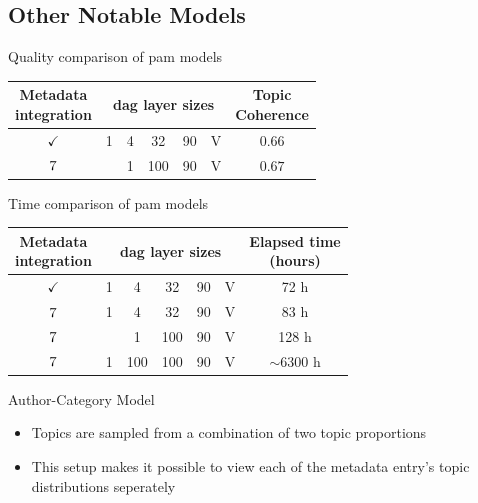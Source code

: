\subsection{Other Notable Models}

\begin{frame}{\insertsubsection}{Quality comparison of \acrshort{pam} models}
	\centering
	\begin{tabular}{c|c|c|c|c|c|c}
		\makecell{Metadata \\ integration} & \multicolumn{5}{c}{\gls{dag} layer sizes} \vline & \makecell{Topic \\ Coherence} \\
		\hline
		$\checkmark$ & 1 & 4 & 32 & 90 & V & $0.66$\\
		$\xmark$ & & 1 & 100 & 90 & V & $0.67$ \\
	\end{tabular}
\end{frame}


\begin{frame}{\insertsubsection}{Time comparison of \acrshort{pam} models}
	\begin{tabular}{c|c|c|c|c|c|c}
		\makecell{Metadata \\ integration} & \multicolumn{5}{c}{\gls{dag} layer sizes} \vline & \makecell{Elapsed time \\ (hours)} \\
		\hline
		$\checkmark$ & 1 & 4 & 32 & 90 & V & 72 h\\
		$\xmark$ & 1 & 4 & 32 & 90 & V & 83 h\\
		$\xmark$ & & 1 & 100 & 90 & V &  128 h\\
		$\xmark$ & 1 & 100 & 100 & 90 & V & $\sim 6300$ h\\
	\end{tabular}
\end{frame}

\begin{frame}{\insertsubsection}{Author-Category Model}
	\begin{figure}
		\centering
		\resizebox{0.3\columnwidth}{!}{%
			
		}
	\end{figure}
	\begin{itemize}
		\item<1-> Topics are sampled from a combination of two topic proportions
		\item<2-> This setup makes it possible to view each of the metadata entry's topic distributions seperately
	\end{itemize}
\end{frame}

